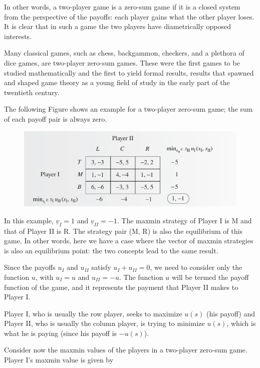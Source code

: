 In other words, a two-player game is a zero-sum game if it is a closed system from the perspective of the payoffs: each player gains what the other player loses. It is clear that in such a game the two players have diametrically opposed interests.	

Many classical games, such as chess, backgammon, checkers, and a plethora of dice games, are two-player zero-sum games. These were the first games to be studied mathematically and the first to yield formal results, results that spawned and shaped game theory as a young field of study in the early part of the twentieth century.

The following Figure shows an example for a two-player zero-sum game; the sum of each payoff pair is always zero.

\begin{figure}[H]
    \centering
    \includegraphics[scale=0.75]{images/2023-10-10-game_theory_50.png}
\end{figure}

In this example, $\underline{v}_I = 1$ and $\underline{v}_{II} =-1$. The maxmin strategy of Player I is M and that of Player II is R. The strategy pair (M, R) is also the equilibrium of this game. In other words, here we have a case where the vector of maxmin strategies is also an equilibrium point: the two concepts lead to the same result.

Since the payoffs $u_I$ and $u_{II}$ satisfy $u_I + u_{II} = 0$, we need to consider only the function $u$, with $u_I = u$ and $u_{II} =-u$. The function $u$ will be termed the payoff function of the game, and it represents the payment that Player II makes to Player I.

Player I, who is usually the row player, seeks to maximize $u(s)$ (his payoff) and Player II, who is usually the column player, is trying to minimize $u(s)$, which is what he is paying (since his payoff is $- u(s)$).

Consider now the maxmin values of the players in a two-player zero-sum game. Player I’s maxmin value is given by

